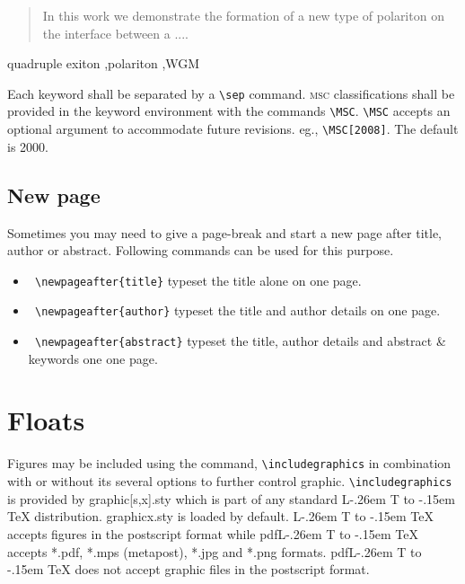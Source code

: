 \documentclass[a4paper,12pt]{article}
\makeatletter
\def\file#1{\textsf{#1}\xspace}
\DeclareRobustCommand{\LaTeX}{L\kern-.26em%
        {\sbox\z@ T%
         \vbox to\ht\z@{\hbox{\check@mathfonts
           \fontsize\sf@size\z@
           \math@fontsfalse\selectfont
          A\,}%
         \vss}%
        }%
     \kern-.15em%
    \TeX}
\makeatother
\begin{document}
\begin{vquote}
 \begin{abstract}
  In this work we demonstrate the formation of a new type of 
  polariton on the interface between a ....
 \end{abstract}
\end{vquote} 

\vspace*{-.5pc}
\begin{vquote}
 \begin{keyword}
  quadruple exiton \sep polariton \sep WGM
 \end{keyword}
\end{vquote}

\noindent Each keyword shall be separated by a \verb+\sep+ command.
\textsc{msc} classifications shall be provided in 
the keyword environment with the commands
\verb+\MSC+. \verb+\MSC+ accepts an optional
argument to accommodate future revisions.
eg., \verb=\MSC[2008]=. The default is 2000.

\subsection{New page}
Sometimes you may need to give a page-break and start a new page after
title, author or abstract. Following commands can be used for this
purpose.

\begin{vquote}
\end{vquote}


\begin{itemize}
\leftskip-2pc
\item [] {\tt\color{verbcolor} \verb+\newpageafter{title}+} typeset the title alone on one page.

\item [] {\tt\color{verbcolor} \verb+\newpageafter{author}+}  typeset the title
and author details on one page.

\item [] {\tt\color{verbcolor} \verb+\newpageafter{abstract}+}
typeset the title,
author details and abstract \& keywords one one page.

\end{itemize}

\section{Floats}
{Figures} may be included using the command, \verb+\includegraphics+ in
combination with or without its several options to further control
graphic. \verb+\includegraphics+ is provided by \file{graphic[s,x].sty}
which is part of any standard \LaTeX{} distribution.
\file{graphicx.sty} is loaded by default. \LaTeX{} accepts figures in
the postscript format while pdf\LaTeX{} accepts \file{*.pdf},
\file{*.mps} (metapost), \file{*.jpg} and \file{*.png} formats. 
pdf\LaTeX{} does not accept graphic files in the postscript format. 
\end{document}
